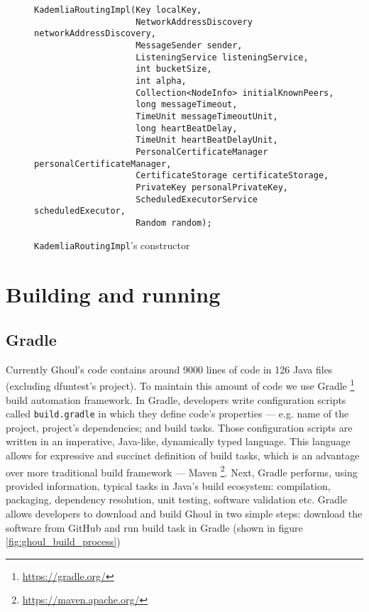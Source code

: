 \begin{figure}[tbp]
\begin{lstlisting}
KademliaRoutingImpl(Key localKey,
                    NetworkAddressDiscovery networkAddressDiscovery,
                    MessageSender sender,
                    ListeningService listeningService,
                    int bucketSize,
                    int alpha,
                    Collection<NodeInfo> initialKnownPeers,
                    long messageTimeout,
                    TimeUnit messageTimeoutUnit,
                    long heartBeatDelay,
                    TimeUnit heartBeatDelayUnit,
                    PersonalCertificateManager personalCertificateManager,
                    CertificateStorage certificateStorage,
                    PrivateKey personalPrivateKey,
                    ScheduledExecutorService scheduledExecutor,
                    Random random);
\end{lstlisting}
\caption{\texttt{KademliaRoutingImpl}'s constructor}
\label{fig:routing_constr_header}
\end{figure}

\section{Building and running}
\label{sec:build}

\subsection{Gradle}
Currently Ghoul's code contains around 9000 lines of code in 126 Java files
(excluding dfuntest's project).
To maintain this amount of code we use Gradle
\footnote{\url{https://gradle.org/}} build automation framework.
In Gradle, developers write configuration scripts called \texttt{build.gradle}
in which they define code's properties --- e.g. name of the project, project's
dependencies; and build tasks.
Those configuration scripts are written in an imperative, Java-like, dynamically
typed language.
This language allows for expressive and succinct definition of build tasks,
which is an advantage over more traditional build framework --- Maven
\footnote{\url{https://maven.apache.org/}}.
Next, Gradle performs, using provided information, typical tasks in Java's build
ecosystem: compilation, packaging, dependency resolution, unit testing, software
validation etc.
Gradle allows developers to download and build Ghoul in two simple steps:
download the software from GitHub and run build task in Gradle (shown in figure
\ref{fig:ghoul_build_process})

